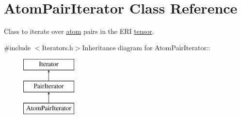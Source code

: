 \hypertarget{classJKBuilder_1_1AtomPairIterator}{
\section{AtomPairIterator Class Reference}
\label{classJKBuilder_1_1AtomPairIterator}
}


Class to iterate over \hyperlink{classJKBuilder_1_1atom}{atom} pairs in the ERI \hyperlink{classJKBuilder_1_1tensor}{tensor}.  


{\ttfamily \#include $<$Iterators.h$>$}Inheritance diagram for AtomPairIterator::\begin{figure}[H]
\begin{center}
\leavevmode
\includegraphics[height=3cm]{classJKBuilder_1_1AtomPairIterator}
\end{center}
\end{figure}
